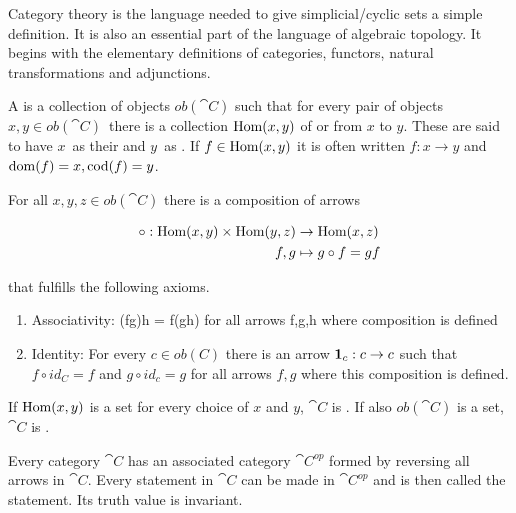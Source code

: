 \documentclass[../../main.tex]{subfiles}
\begin{document}
    Category theory is the language needed to give simplicial/cyclic sets a simple definition. It is also an essential part of the language of algebraic topology. It begins with the elementary definitions of categories, functors, natural transformations and adjunctions.

    \begin{definition}
        A  is a collection of objects $ob(\cat{C})$ such that for every pair of objects $x, y \in ob(\cat{C})$ there is a collection $\Hom(x, y)$ of  or  from $x$ to $y$. These are said to have $x$ as their  and $y$ as . If $f \in \Hom(x, y)$ it is often written $f: x \to y$ and $\domain{f} = x, \codomain{f} = y$.
        
        For all $x, y, z \in ob(\cat{C})$ there is a composition of arrows 
        
        \begin{align*}
            \circ: \Hom(x, y) \times \Hom(y, z) &\to \Hom(x, z) \\ 
            f, g &\mapsto g \circ f = gf
        \end{align*}
        
        that fulfills the following axioms.

        \begin{enumerate}
            \item Associativity: (fg)h = f(gh) for all arrows f,g,h where composition is defined
            \item Identity: For every $c \in ob(C)$ there is an arrow $\idarrow[c]: c \to c$ such that $f \circ id_C = f$ and $g \circ id_c = g$ for all arrows $f, g$ where this composition is defined.
        \end{enumerate}
    \end{definition}

    \begin{definition}
        If $\Hom(x, y)$ is a set for every choice of $x$ and $y$, $\cat{C}$ is . If also $ob(\cat{C})$ is a set, $\cat{C}$ is .
    \end{definition}
    
    Every category $\cat{C}$ has an associated category $\cat{C^{op}}$ formed by reversing all arrows in $\cat{C}$. Every statement in $\cat{C}$ can be made in $\cat{C^{op}}$ and is then called the  statement. Its truth value is invariant.
\end{document}
